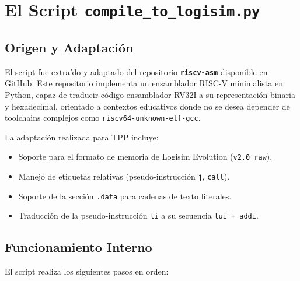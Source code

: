 \section{El Script \texttt{compile\_to\_logisim.py}}

\subsection{Origen y Adaptación}

El script fue extraído y adaptado del repositorio \textbf{\texttt{riscv-asm}} disponible en GitHub. Este repositorio implementa un ensamblador RISC-V minimalista en Python, capaz de traducir código ensamblador RV32I a su representación binaria y hexadecimal, orientado a contextos educativos donde no se desea depender de toolchains complejos como \texttt{riscv64-unknown-elf-gcc}.

La adaptación realizada para TPP incluye:
\begin{itemize}
    \item Soporte para el formato de memoria de Logisim Evolution (\texttt{v2.0 raw}).
    \item Manejo de etiquetas relativas (pseudo-instrucción \texttt{j}, \texttt{call}).
    \item Soporte de la sección \texttt{.data} para cadenas de texto literales.
    \item Traducción de la pseudo-instrucción \texttt{li} a su secuencia \texttt{lui + addi}.
\end{itemize}

\subsection{Funcionamiento Interno}

El script realiza los siguientes pasos en orden:

